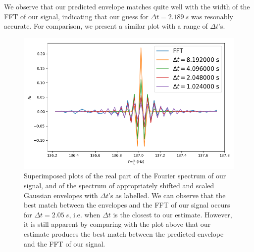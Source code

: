 \documentclass[11pt]{article}
\begin{document}
\begin{enumerate}
	We observe that our predicted envelope matches quite well with the width of the FFT of our signal, indicating that our guess for $\Delta t = 2.189 \ s$ was resonably accurate. For comparison, we present a similar plot with a range of $\Delta t$'s.
	\begin{figure}[htp]
\centering
\includegraphics[scale=0.70]{dt_compare_others.png}
\caption{Superimposed plots of the real part of the Fourier spectrum of our signal, and of the spectrum of appropriately shifted and scaled Gaussian envelopes with $\Delta t$'s as labelled. We can observe that the best match between the envelopes and the FFT of our signal occurs for $\Delta t = 2.05 \ s$, i.e. when $\Delta t$ is the closest to our estimate. However, it is still apparent by comparing with the plot above that our estimate produces the best match between the predicted envelope and the FFT of our signal.}
\label{comp_2}
\end{figure}
\end{enumerate}
\newpage
\end{document}
